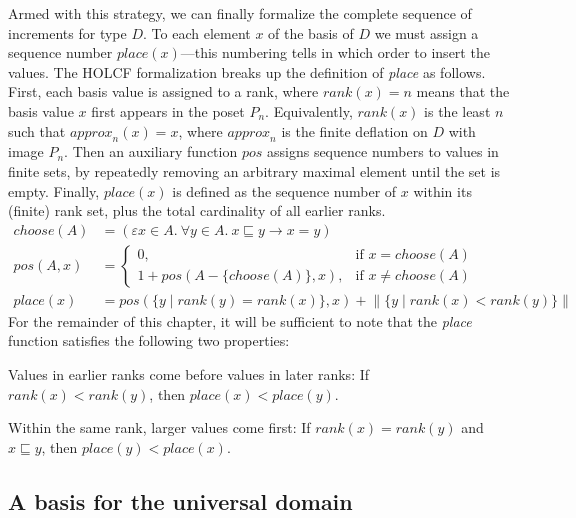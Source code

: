 Armed with this strategy, we can finally formalize the complete sequence of increments for type $D$. To each element $x$ of the basis of $D$ we must assign a sequence number $\mathit{place}(x)$---this numbering tells in which order to insert the values. The HOLCF formalization breaks up the definition of \emph{place} as follows. First, each basis value is assigned to a rank, where $\mathit{rank}(x) = n$ means that the basis value $x$ first appears in the poset $P_n$. Equivalently, $\mathit{rank}(x)$ is the least $n$ such that $\mathit{approx}_n(x) = x$, where $\mathit{approx}_n$ is the finite deflation on $D$ with image $P_n$. Then an auxiliary function $\mathit{pos}$ assigns sequence numbers to values in finite sets, by repeatedly removing an arbitrary maximal element until the set is empty. Finally, $\mathit{place}(x)$ is defined as the sequence number of $x$ within its (finite) rank set, plus the total cardinality of all earlier ranks.
%
\begin{align}
\mathit{choose}(A) & = (\varepsilon x \in A.\ \forall y \in A.\ x \sqsubseteq y \longrightarrow x = y)
\\
pos(A,x) & =
\begin{cases} 
  0,  & \mbox{if }x = \mathit{choose}(A) \\
  1 + \mathit{pos}(A - \{\mathit{choose}(A)\}, x), & \mbox{if }x \neq \mathit{choose}(A)
\end{cases}
\\
\mathit{place}(x) & = \mathit{pos}(\{y \mid \mathit{rank}(y) = \mathit{rank}(x)\}, x) + \lVert\{y \mid \mathit{rank}(x) < \mathit{rank}(y)\}\rVert
\end{align}
For the remainder of this chapter, it will be sufficient to note that the \emph{place} function satisfies the following two properties:
%
\begin{theorem} Values in earlier ranks come before values in later ranks: If $\mathit{rank}(x) < \mathit{rank}(y)$, then $\mathit{place}(x) < \mathit{place}(y)$.
\end{theorem}
\begin{theorem} Within the same rank, larger values come first: If $\mathit{rank}(x) = \mathit{rank}(y)$ and $x \sqsubseteq y$, then $\mathit{place}(y) < \mathit{place}(x)$.
\end{theorem}

\subsection{A basis for the universal domain}
\label{sec:universal-basis}


